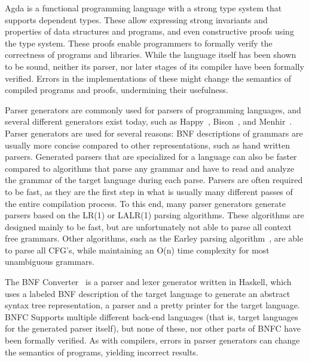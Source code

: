 \documentclass{article}
\begin{document}
	Agda is a functional programming language with a strong type system that
	supports dependent types. These allow expressing strong invariants and
	properties of data structures and programs, and even constructive proofs
	using the type system. These proofs enable programmers to formally verify
	the correctness of programs and libraries. While the language itself has
	been shown to be sound, neither its parser, nor later stages of its
	compiler have been formally verified. Errors in the implementations of
	these might change the semantics of compiled programs and proofs,
	undermining their usefulness.

	Parser generators are commonly used for parsers of programming languages,
	and several different generators exist today, such as Happy~\cite{Happy},
	Bison~\cite{Bison}, and Menhir~\cite{Menhir}. Parser generators are used
	for several reasons: BNF descriptions of grammars are usually more concise
	compared to other representations, such as hand written parsers. Generated
	parsers that are specialized for a language can also be faster compared to
	algorithms that parse any grammar and have to read and analyze the grammar
	of the target language during each parse. Parsers are often required to be
	fast, as they are the first step in what is usually many different passes
	of the entire compilation process. To this end, many parser generators
	generate parsers based on the LR(1) or LALR(1) parsing algorithms. These
	algorithms are designed mainly to be fast, but are unfortunately not able
	to parse all context free grammars.  Other algorithms, such as the Earley
	parsing algorithm~\cite{Earley}, are able to parse all CFG's, while
	maintaining an O(n) time complexity for most unambiguous grammars.

	The BNF Converter~\cite{BNFC} is a parser and lexer generator written in
	Haskell, which uses a labeled BNF description of the target language to
	generate an abstract syntax tree representation, a parser and a pretty
	printer for the target language. BNFC Supports multiple different back-end
	languages (that is, target languages for the generated parser itself), but
	none of these, nor other parts of BNFC have been formally verified. As with
	compilers, errors in parser generators can change the semantics of
	programs, yielding incorrect results. 
	
	
\end{document}
